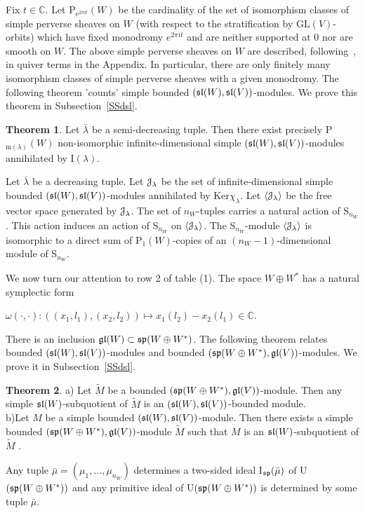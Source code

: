 \documentclass[12pt]{amsart}
\theoremstyle{definition}\newtheorem{theorem}{Theorem}[section]
\theoremstyle{definition}\newtheorem{definition}[proposition]{Definition}
\theoremstyle{remark}\newtheorem{example}[proposition]{Example}
\begin{document}
Fix $t\in\mathbb C$. Let P$_{\mathrm e^{2\pi it}}(W)$ be the cardinality of the set of isomorphism classes of simple perverse sheaves on $W$ (with respect to the stratification by GL$(V)$-orbits) which have fixed monodromy $e^{2\pi it}$ and are neither supported at 0 nor are smooth on $W$.
The above simple perverse sheaves on $W$ are described, following~\cite{BR}, in quiver terms in the Appendix. In particular, there are only finitely many isomorphism classes of simple perverse sheaves with a given monodromy. The following theorem 'counts' simple bounded $(\frak{sl}(W), \frak{sl}(V))$-modules. We prove this theorem in Subsection~\ref{SSdsl}.
\begin{theorem}\label{Tgkps}Let $\bar\lambda$ be a semi-decreasing tuple. Then there exist precisely P$_{\mathrm m(\lambda)}(W)$ non-isomorphic infinite-dimensional simple $(\frak{sl}(W), \frak{sl}(V))$-modules annihilated by I$(\lambda)$.\end{theorem}
Let $\bar\lambda$ be a decreasing tuple. Let $\EuScript J_\lambda$ be the set of infinite-dimensional simple bounded $(\frak{sl}(W), \frak{sl}(V))$-modules annihilated by Ker$\chi_\lambda$. Let $\langle\EuScript J_\lambda\rangle$ be the free vector space generated by $\EuScript J_\lambda$. The set of $n_W$-tuples carries a natural action of S$_{n_W}$. This action induces an action of S$_{n_W}$ on $\langle\EuScript J_\lambda\rangle$. The S$_{n_W}$-module $\langle\EuScript J_\lambda\rangle$ is isomorphic to a direct sum of P$_1(W)$-copies of an $(n_W-1)$-dimensional module of S$_{n_W}$.

We now turn our attention to row 2 of table (1). The space $W\oplus W^*$ has a natural symplectic form \begin{center}$\omega(\cdot, \cdot):((x_1, l_1), (x_2, l_2))\mapsto x_1(l_2)-x_2(l_1)\in\mathbb C$.\end{center} There is an inclusion $\frak{gl}(W)\subset\frak{sp}(W\oplus W^*)$. The following theorem relates bounded $(\frak{sl}(W), \frak{sl}(V))$-modules and bounded $(\frak{sp}(W\oplus W^*), \frak{gl}(V))$-modules. We prove it in Subsection~\ref{SSdsl}.
\begin{theorem}\label{Tsptosl}a) Let $\tilde M$ be a bounded $(\frak{sp}(W\oplus W^*), \frak{gl}(V))$-module. Then any simple $\frak{sl}(W)$-subquotient of $\tilde M$ is an $(\frak{sl}(W), \frak{sl}(V))$-bounded module.\\b)Let $M$ be a simple bounded $(\frak{sl}(W), \frak{sl}(V))$-module. Then there exists a simple bounded $(\frak{sp}(W\oplus W^*), \frak{gl}(V))$-module $\tilde M$ such that $M$ is an $\frak{sl}(W)$-subquotient of $\tilde M$ .\end{theorem}
Any tuple $\bar\mu=(\mu_1,..., \mu_{n_W})$ determines a two-sided ideal I$_\frak{sp}(\bar\mu)$ of U$(\frak{sp}(W\oplus W^*))$ and any primitive ideal of U$(\frak{sp}(W\oplus W^*))$ is determined by some tuple $\bar\mu$.
\end{document}
